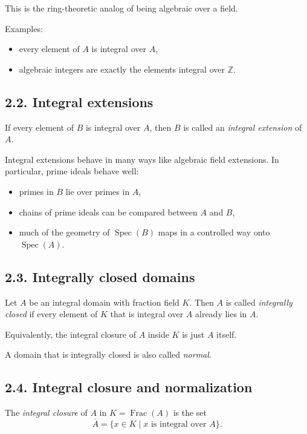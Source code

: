 \documentclass[12pt,a4paper]{article}
\theoremstyle{plain}
\theoremstyle{definition}      %
\begin{document}
This is the ring-theoretic analog of being algebraic over a field.

Examples:
\begin{itemize}
	\item every element of \(A\) is integral over \(A\),
	\item algebraic integers are exactly the elements integral over \(\mathbb{Z}\).
\end{itemize}

\subsection*{2.2. Integral extensions}

If every element of \(B\) is integral over \(A\), then \(B\) is called an \emph{integral extension} of \(A\).

Integral extensions behave in many ways like algebraic field extensions. In particular, prime ideals behave well:
\begin{itemize}
	\item primes in \(B\) lie over primes in \(A\),
	\item chains of prime ideals can be compared between \(A\) and \(B\),
	\item much of the geometry of \(\operatorname{Spec}(B)\) maps in a controlled way onto \(\operatorname{Spec}(A)\).
\end{itemize}

\subsection*{2.3. Integrally closed domains}

Let \(A\) be an integral domain with fraction field \(K\). Then \(A\) is called \emph{integrally closed} if every element of \(K\) that is integral over \(A\) already lies in \(A\).

Equivalently, the integral closure of \(A\) inside \(K\) is just \(A\) itself.

A domain that is integrally closed is also called \emph{normal}.

\subsection*{2.4. Integral closure and normalization}

The \emph{integral closure} of \(A\) in \(K=\operatorname{Frac}(A)\) is the set
\[
\overline{A}
=
\{x\in K \mid x \text{ is integral over } A\}.
\]
\end{document}
